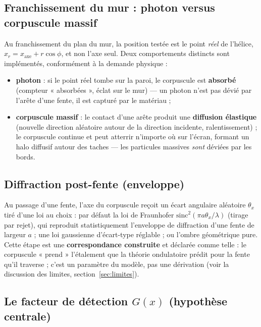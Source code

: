 \documentclass[11pt,a4paper]{article}
\begin{document}
\subsection{Franchissement du mur : photon versus corpuscule massif}

Au franchissement du plan du mur, la position testée est le point \emph{réel} de
l'hélice, $x_r = x_{\mathrm{axe}} + r\cos\phi$, et non l'axe seul. Deux
comportements distincts sont implémentés, conformément à la demande physique :
\begin{itemize}[leftmargin=1.6em,itemsep=0.15em]
  \item \textbf{photon} : si le point réel tombe sur la paroi, le corpuscule est
        \textbf{absorbé} (compteur « absorbées », éclat sur le mur) --- un photon
        n'est pas dévié par l'arête d'une fente, il est capturé par le matériau ;
  \item \textbf{corpuscule massif} : le contact d'une arête produit une
        \textbf{diffusion élastique} (nouvelle direction aléatoire autour de la
        direction incidente, ralentissement) ; le corpuscule continue et peut
        atterrir n'importe où sur l'écran, formant un halo diffusif autour des
        taches --- les particules massives \emph{sont} déviées par les bords.
\end{itemize}

\subsection{Diffraction post-fente (enveloppe)}

Au passage d'une fente, l'axe du corpuscule reçoit un écart angulaire aléatoire
$\theta_x$ tiré d'une loi au choix : par défaut la loi de Fraunhofer
$\mathrm{sinc}^2(\pi a \theta_x/\lambda)$ (tirage par rejet), qui reproduit
statistiquement l'enveloppe de diffraction d'une fente de largeur $a$ ; une loi
gaussienne d'écart-type réglable ; ou l'ombre géométrique pure. Cette étape est une
\textbf{correspondance construite} et déclarée comme telle : le corpuscule « prend »
l'étalement que la théorie ondulatoire prédit pour la fente qu'il traverse ;
c'est un paramètre du modèle, pas une dérivation
(voir la discussion des limites, section~\ref{sec:limites}).

\subsection{Le facteur de détection $G(x)$ (hypothèse centrale)}
\end{document}

